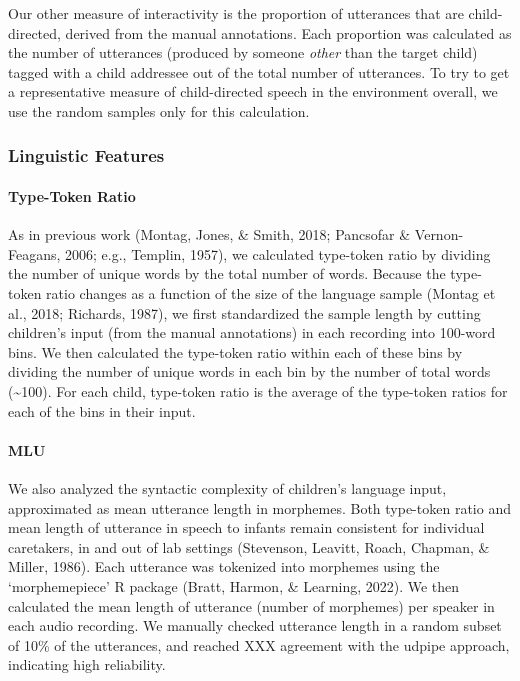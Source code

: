 \documentclass[
  man,floatsintext]{apa6}
\let\oldparagraph\paragraph
\renewcommand{\paragraph}[1]{\oldparagraph{#1}\mbox{}}
\begin{document}
Our other measure of interactivity is the proportion of utterances that are child-directed, derived from the manual annotations. Each proportion was calculated as the number of utterances (produced by someone \emph{other} than the target child) tagged with a child addressee out of the total number of utterances. To try to get a representative measure of child-directed speech in the environment overall, we use the random samples only for this calculation.

\hypertarget{linguistic-features}{%
\subsubsection{Linguistic Features}\label{linguistic-features}}

\hypertarget{type-token-ratio}{%
\paragraph{Type-Token Ratio}\label{type-token-ratio}}

As in previous work (Montag, Jones, \& Smith, 2018; Pancsofar \& Vernon-Feagans, 2006; e.g., Templin, 1957), we calculated type-token ratio by dividing the number of unique words by the total number of words. Because the type-token ratio changes as a function of the size of the language sample (Montag et al., 2018; Richards, 1987), we first standardized the sample length by cutting children's input (from the manual annotations) in each recording into 100-word bins. We then calculated the type-token ratio within each of these bins by dividing the number of unique words in each bin by the number of total words (\textasciitilde100). For each child, type-token ratio is the average of the type-token ratios for each of the bins in their input.

\hypertarget{mlu}{%
\paragraph{MLU}\label{mlu}}

We also analyzed the syntactic complexity of children's language input, approximated as mean utterance length in morphemes. Both type-token ratio and mean length of utterance in speech to infants remain consistent for individual caretakers, in and out of lab settings (Stevenson, Leavitt, Roach, Chapman, \& Miller, 1986). Each utterance was tokenized into morphemes using the `morphemepiece' R package (Bratt, Harmon, \& Learning, 2022). We then calculated the mean length of utterance (number of morphemes) per speaker in each audio recording. We manually checked utterance length in a random subset of 10\% of the utterances, and reached XXX agreement with the udpipe approach, indicating high reliability.
\end{document}
